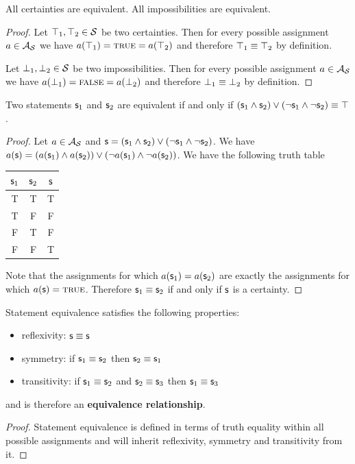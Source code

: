 \documentclass[11pt,letterpaper,fleqn]{memoir} %
\begin{document}
\begin{mathSection}

\begin{coro}
	All certainties are equivalent. All impossibilities are equivalent.
\end{coro}
\begin{proof}
	Let $\top_1, \top_2 \in \mathcal{S}$ be two certainties. Then for every possible assignment $a \in \mathcal{A}_{\mathcal{S}}$ we have $a(\top_1) = \textsc{true} = a(\top_2)$ and therefore $\top_1 \equiv \top_2$ by definition.
	
	Let $\bot_1, \bot_2 \in \mathcal{S}$ be two impossibilities. Then for every possible assignment $a \in \mathcal{A}_{\mathcal{S}}$ we have $a(\bot_1) = \textsc{false} = a(\bot_2)$ and therefore $\bot_1 \equiv \bot_2$ by definition.
\end{proof}

\begin{coro}
	Two statements $\mathsf{s}_1$ and $\mathsf{s}_2$ are equivalent if and only if $(\mathsf{s}_1 \wedge \mathsf{s}_2) \vee (\neg\mathsf{s}_1 \wedge \neg\mathsf{s}_2) \equiv \top$.
\end{coro}
\begin{proof}
	Let $a \in \mathcal{A}_{\mathcal{S}}$ and $\mathsf{s} = ( \mathsf{s}_1 \wedge \mathsf{s}_2) \vee (\neg\mathsf{s}_1 \wedge \neg\mathsf{s}_2)$. We have $a(\mathsf{s}) = (a(\mathsf{s}_1) \wedge a(\mathsf{s}_2)) \vee (\neg a(\mathsf{s}_1) \wedge \neg a(\mathsf{s}_2))$. We have the following truth table
	\begin{center}
	\begin{tabular}{c|c|c}
		$\mathsf{s}_1$ & $\mathsf{s}_2$ & $\mathsf{s}$\\
		\hline
		T & T & T \\
		T & F & F \\
		F & T & F \\
		F & F & T\\
	\end{tabular}
	\end{center}
	Note that the assignments for which $a(\mathsf{s}_1) = a(\mathsf{s}_2)$ are exactly the assignments for which $a(\mathsf{s}) = \textsc{true}$. Therefore $\mathsf{s}_1 \equiv \mathsf{s}_2$ if and only if $\mathsf{s}$ is a certainty.
\end{proof}

\begin{coro}
	Statement equivalence satisfies the following properties:
	\begin{itemize}
		\item reflexivity: $\mathsf{s} \equiv \mathsf{s}$
		\item symmetry: if $\mathsf{s}_1 \equiv \mathsf{s}_2$ then $\mathsf{s}_2 \equiv \mathsf{s}_1$
		\item transitivity: if $\mathsf{s}_1 \equiv \mathsf{s}_2$ and $\mathsf{s}_2 \equiv \mathsf{s}_3$ then $\mathsf{s}_1 \equiv \mathsf{s}_3$
	\end{itemize}
	and is therefore an \textbf{equivalence relationship}.
\end{coro}
\begin{proof}
	Statement equivalence is defined in terms of truth equality within all possible assignments and will inherit reflexivity, symmetry and transitivity from it.
\end{proof}


\end{mathSection}
\end{document}
